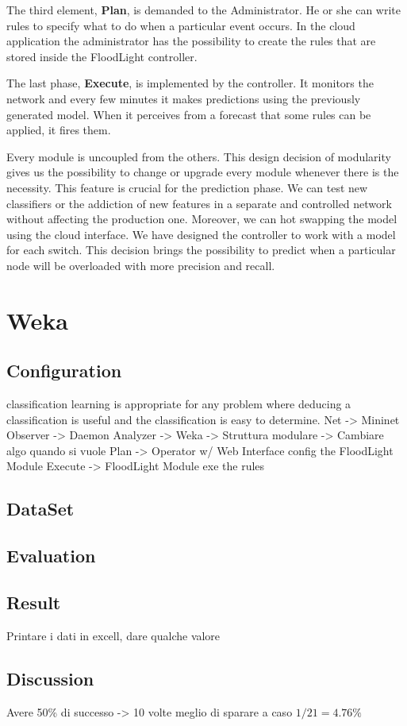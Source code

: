 \documentclass[12pt]{article}
\begin{document}
The third element, \textbf{Plan}, is demanded to the Administrator.
He or she can write rules to specify what to do when a particular event occurs.
In the cloud application the administrator has the possibility to create the rules that are stored inside the FloodLight controller.


The last phase, \textbf{Execute}, is implemented by the controller. 
It monitors the network and every few minutes it makes predictions using the previously generated model.
When it perceives from a forecast that some rules can be applied, it fires them.


Every module is uncoupled from the others. This design decision of modularity gives us the possibility to change or upgrade every module whenever there is the necessity.
This feature is crucial for the prediction phase. We can test new classifiers or the addiction of new features in a separate and controlled network without affecting the production one. Moreover, we can hot swapping the model using the cloud interface.
We have designed the controller to work with a model for each switch. This decision brings the possibility to predict when a particular node will be overloaded with more precision and recall.\\

 







\section{Weka}
\subsection{Configuration}
classification learning is appropriate for any problem where deducing a classification is useful and the classification is easy to determine.
Net -> Mininet\\
Observer -> Daemon
Analyzer -> Weka -> Struttura modulare -> Cambiare algo quando si vuole
Plan -> Operator w/ Web Interface config the FloodLight Module
Execute -> FloodLight Module exe the rules
\subsection{DataSet}
\subsection{Evaluation}
\subsection{Result}
Printare i dati in excell, dare qualche valore
\subsection{Discussion}
Avere 50\% di successo -> 10 volte meglio di sparare a caso $1/21 = 4.76\%$
	
	
\end{document}

